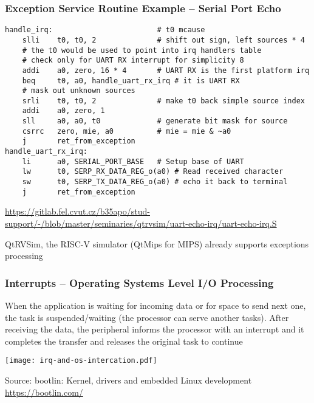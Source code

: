 \documentclass{beamer}
\begin{document}
\begin{frame}[fragile]
\frametitle{Exception Service Routine Example -- Serial Port Echo}

\begin{verbatim}
handle_irq:                        # t0 mcause
    slli    t0, t0, 2              # shift out sign, left sources * 4
    # the t0 would be used to point into irq handlers table
    # check only for UART RX interrupt for simplicity 8
    addi    a0, zero, 16 * 4       # UART RX is the first platform irq
    beq     t0, a0, handle_uart_rx_irq # it is UART RX
    # mask out unknown sources
    srli    t0, t0, 2              # make t0 back simple source index
    addi    a0, zero, 1
    sll     a0, a0, t0             # generate bit mask for source
    csrrc   zero, mie, a0          # mie = mie & ~a0
    j       ret_from_exception
handle_uart_rx_irq:
    li      a0, SERIAL_PORT_BASE   # Setup base of UART
    lw      t0, SERP_RX_DATA_REG_o(a0) # Read received character
    sw      t0, SERP_TX_DATA_REG_o(a0) # echo it back to terminal
    j       ret_from_exception
\end{verbatim}

\tiny

\url{https://gitlab.fel.cvut.cz/b35apo/stud-support/-/blob/master/seminaries/qtrvsim/uart-echo-irq/uart-echo-irq.S}

QtRVSim, the RISC-V simulator (QtMips for MIPS) already supports exceptions processing

\end{frame}

\begin{frame}
\frametitle{Interrupts -- Operating Systems Level I/O Processing}

When the application is waiting for incoming data or for space to send next one, the task is suspended/waiting (the processor can serve another tasks). After receiving the data, the peripheral
informs the processor with an interrupt and it completes the transfer and releases
the original task to continue

\begin{center}
  \texttt{[image: irq-and-os-intercation.pdf]}
\end{center}

\tiny

Source: bootlin: Kernel, drivers and embedded Linux development \url{https://bootlin.com/}

\end{frame}
\end{document}
